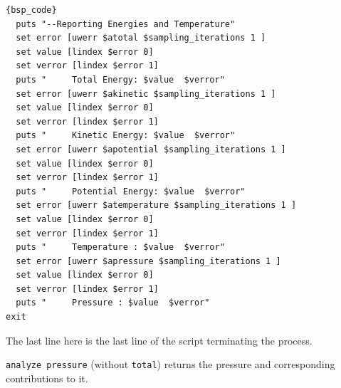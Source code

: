 \documentclass[
paper=a4,                       %
fontsize=11pt,                  %
twoside,                        %
footsepline,                    %
headsepline,                    %
headinclude=false,              %
footinclude=false,              %
pagesize,                       %
]{scrartcl}
\newtheorem{task}{Task}
\begin{document}
{\small\vspace{0,2cm}
\begin{lstlisting}[firstnumber=auto]{bsp_code}
  puts "--Reporting Energies and Temperature"
  set error [uwerr $atotal $sampling_iterations 1 ]
  set value [lindex $error 0]
  set verror [lindex $error 1]
  puts "     Total Energy: $value  $verror"
  set error [uwerr $akinetic $sampling_iterations 1 ]
  set value [lindex $error 0]
  set verror [lindex $error 1]
  puts "     Kinetic Energy: $value  $verror"
  set error [uwerr $apotential $sampling_iterations 1 ]
  set value [lindex $error 0]
  set verror [lindex $error 1]
  puts "     Potential Energy: $value  $verror"
  set error [uwerr $atemperature $sampling_iterations 1 ]
  set value [lindex $error 0]
  set verror [lindex $error 1]
  puts "     Temperature : $value  $verror"
  set error [uwerr $apressure $sampling_iterations 1 ]
  set value [lindex $error 0]
  set verror [lindex $error 1]
  puts "     Pressure : $value  $verror"
exit
\end{lstlisting}}%
\noindent The last line here is the last line of the script terminating the process.

      



\vspace{1cm}\vspace{1cm}

 \texttt{analyze pressure} (without \texttt{total}) returns the pressure and
corresponding contributions to it.
\newpage
\end{document}

